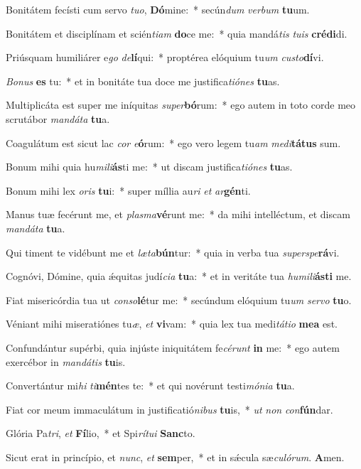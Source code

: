 ﻿\item Bonitátem fecísti cum servo \emph{tu}\emph{o}, \textbf{Dó}mine:~* secún\emph{dum} \emph{ver}\emph{bum} \textbf{tu}um.
\item Bonitátem et disciplínam et scién\emph{ti}\emph{am} \textbf{do}ce me:~* quia mandá\emph{tis} \emph{tu}\emph{is} \textbf{cré}\textbf{di}di.
\item Priúsquam humiliárer e\emph{go} \emph{de}\textbf{lí}qui:~* proptérea elóquium tu\emph{um} \emph{cus}\emph{to}\textbf{dí}vi.
\item \emph{Bo}\emph{nus} \textbf{es} tu:~* et in bonitáte tua doce me justifica\emph{ti}\emph{ó}\emph{nes} \textbf{tu}as.
\item Multiplicáta est super me iníquitas \emph{su}\emph{per}\textbf{bó}rum:~* ego autem in toto corde meo scrutábor \emph{man}\emph{dá}\emph{ta} \textbf{tu}a.
\item Coagulátum est sicut lac \emph{cor} \emph{e}\textbf{ó}rum:~* ego vero legem tu\emph{am} \emph{me}\emph{di}\textbf{tá}\textbf{tus} sum.
\item Bonum mihi quia hu\emph{mi}\emph{li}\textbf{ás}ti me:~* ut discam justifica\emph{ti}\emph{ó}\emph{nes} \textbf{tu}as.
\item Bonum mihi lex \emph{o}\emph{ris} \textbf{tu}i:~* super míllia au\emph{ri} \emph{et} \emph{ar}\textbf{gén}ti.
\item Manus tuæ fecérunt me, et \emph{plas}\emph{ma}\textbf{vé}runt me:~* da mihi intelléctum, et discam \emph{man}\emph{dá}\emph{ta} \textbf{tu}a.
\item Qui timent te vidébunt me et \emph{læ}\emph{ta}\textbf{bún}tur:~* quia in verba tua \emph{su}\emph{per}\emph{spe}\textbf{rá}vi.
\item Cognóvi, Dómine, quia ǽquitas judí\emph{ci}\emph{a} \textbf{tu}a:~* et in veritáte tua \emph{hu}\emph{mi}\emph{li}\textbf{ás}\textbf{ti} me.
\item Fiat misericórdia tua ut \emph{con}\emph{so}\textbf{lé}tur me:~* secúndum elóquium tu\emph{um} \emph{ser}\emph{vo} \textbf{tu}o.
\item Véniant mihi miseratiónes tu\emph{æ}, \emph{et} \textbf{vi}vam:~* quia lex tua medi\emph{tá}\emph{ti}\emph{o} \textbf{me}\textbf{a} est.
\item Confundántur supérbi, quia injúste iniquitátem fe\emph{cé}\emph{runt} \textbf{in} me:~* ego autem exercébor in \emph{man}\emph{dá}\emph{tis} \textbf{tu}is.
\item Convertántur mi\emph{hi} \emph{ti}\textbf{mén}tes te:~* et qui novérunt testi\emph{mó}\emph{ni}\emph{a} \textbf{tu}a.
\item Fiat cor meum immaculátum in justificatió\emph{ni}\emph{bus} \textbf{tu}is,~* \emph{ut} \emph{non} \emph{con}\textbf{fún}dar.
\item Glória Pa\emph{tri}, \emph{et} \textbf{Fí}lio,~* et Spi\emph{rí}\emph{tu}\emph{i} \textbf{Sanc}to.
\item Sicut erat in princípio, et \emph{nunc}, \emph{et} \textbf{sem}per,~* et in sǽcula sæ\emph{cu}\emph{ló}\emph{rum}. \textbf{A}men.